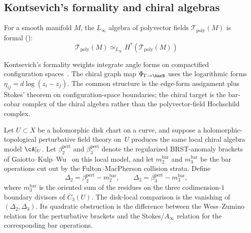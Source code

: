 \subsection{Kontsevich's formality and chiral algebras}

\begin{theorem}
\label{thm:kontsevich-formality-feynman}
For a smooth manifold $M$, the $L_\infty$ algebra of polyvector fields
$\mathcal{T}_{\text{poly}}(M)$ is formal (\cite{Kon03}):
\[\mathcal{T}_{\text{poly}}(M) \simeq_{L_\infty} H^*(\mathcal{T}_{\text{poly}}(M))\]
\end{theorem}

\begin{remark}
\label{rem:kontsevich-graphs}
\label{sec:connections-other-feynman}
Kontsevich's formality weights integrate angle forms on compactified
configuration spaces~\cite{Kon99}.  The chiral graph map
\(\Phi_{\Gamma\to\barB}\) uses the logarithmic forms
\(\eta_{ij}=d\log(z_i-z_j)\).  The common structure is the
edge-form assignment plus Stokes' theorem on configuration-space
boundaries; the chiral target is the bar-cobar complex of the chiral
algebra rather than the polyvector-field Hochschild complex.
\end{remark}

\begin{definition}
\label{def:disk-local-perturbative-fm}
Let $U \subset X$ be a holomorphic disk chart on a curve, and suppose a
holomorphic-topological perturbative field theory on~$U$ produces the
same local chiral algebra model \(\cA|_U\).  Let
\(\beta_2^{\mathrm{pert}}\) and \(\beta_3^{\mathrm{pert}}\) denote the
regularized BRST-anomaly brackets of Gaiotto--Kulp--Wu~\cite{GKW25}
on this local model, and let \(m_2^{\mathrm{bar}}\) and
\(m_3^{\mathrm{bar}}\) be the bar operations cut out by the
Fulton--MacPherson collision strata.  Define
\[
\Delta_2=\beta_2^{\mathrm{pert}}-m_2^{\mathrm{bar}},
\qquad
\Delta_3=\beta_3^{\mathrm{pert}}-m_3^{\mathrm{bar}},
\]
where \(m_3^{\mathrm{bar}}\) is the oriented sum of the residues on the
three codimension-\(1\) boundary divisors of \(\overline{C}_3(U)\).
The disk-local comparison is the vanishing of
\((\Delta_2,\Delta_3)\).  Its quadratic obstruction is the difference
between the Wess--Zumino relation for the perturbative brackets and the
Stokes/\(A_\infty\) relation for the corresponding bar operations.
\end{definition}

